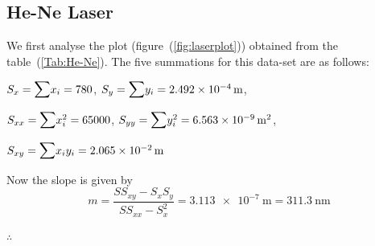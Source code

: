 \documentclass{article}
\begin{document}
    \subsection{He-Ne Laser} 
    We first analyse the plot (figure~(\ref{fig:laserplot})) obtained from the table~(\ref{Tab:He-Ne}).
    The five summations for this data-set are as follows:
    \par
    \vspace{0.5cm}
    $S_{x} = \mathlarger{\mathlarger{\sum}} x_{i} = 780$, \hspace{1cm} $S_{y} = \mathlarger{\mathlarger{\sum}} y_{i} = \SI{2.492e-4}{\metre}$,
    \par
    \vspace{0.5cm}
    $S_{xx} = \mathlarger{\mathlarger{\sum}} x_{i}^2 = 65000$, \hspace{1cm} $S_{yy} = \mathlarger{\mathlarger{\sum}} y_{i}^2 = \SI{6.563e-9}{\metre\squared}$,
    \par
    \vspace{0.5cm}
    $S_{xy} = \mathlarger{\mathlarger{\sum}} x_{i}y_{i} = \SI{2.065e-2}{\metre}$
    \par
    \vspace{0.5cm}
    \noindent
    Now the slope is given by 
    \begin{equation}
    \label{eq1}
        m = \dfrac{S S_{xy} - S_{x}S_{y}}{S S_{xx} - S_{x}^2} = \SI{3.113e-7}{\metre} = \SI{311.3}{\nano \metre}
    \end{equation}
    \par
    \vspace{0.5cm}
    \noindent
    $\therefore$ 
\end{document}
